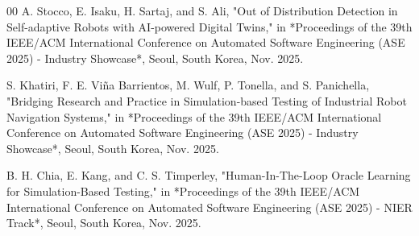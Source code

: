 \documentclass[conference]{IEEEtran}
\begin{document}
\begin{thebibliography}{00}
 A. Stocco, E. Isaku, H. Sartaj, and S. Ali, "Out of Distribution Detection in Self-adaptive Robots with AI-powered Digital Twins," in *Proceedings of the 39th IEEE/ACM International Conference on Automated Software Engineering (ASE 2025) - Industry Showcase*, Seoul, South Korea, Nov. 2025.

 S. Khatiri, F. E. Viña Barrientos, M. Wulf, P. Tonella, and S. Panichella, "Bridging Research and Practice in Simulation-based Testing of Industrial Robot Navigation Systems," in *Proceedings of the 39th IEEE/ACM International Conference on Automated Software Engineering (ASE 2025) - Industry Showcase*, Seoul, South Korea, Nov. 2025.

 B. H. Chia, E. Kang, and C. S. Timperley, "Human-In-The-Loop Oracle Learning for Simulation-Based Testing," in *Proceedings of the 39th IEEE/ACM International Conference on Automated Software Engineering (ASE 2025) - NIER Track*, Seoul, South Korea, Nov. 2025.

\end{thebibliography}
\end{document}
